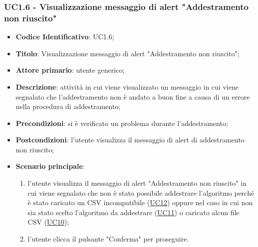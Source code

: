 	\subsubsection{UC1.6 - Visualizzazione messaggio di alert "Addestramento non riuscito"}
		\begin{itemize}
			\item\textbf{Codice Identificativo}: UC1.6;
			\item\textbf{Titolo}: Visualizzazione messaggio di alert "Addestramento non riuscito";
			\item\textbf{Attore primario}: utente generico;
			\item\textbf{Descrizione}: attività in cui viene visualizzato un messaggio in cui viene segnalato che l'addestramento non è andato a buon fine a causa di un errore nella procedura di addestramento;
			\item\textbf{Precondizioni}: si è verificato un problema durante l'addestramento;
			\item\textbf{Postcondizioni}: l'utente visualizza il messaggio di alert di addestramento non riuscito;					
			\item\textbf{Scenario principale}:
				\begin{enumerate}
				\item l'utente visualizza il messaggio di alert "Addestramento non riuscito" in cui viene segnalato che non è stato possibile addestrare l'algoritmo perché è stato caricato un CSV incompatibile (\hyperref[par:UC12]{UC12}) oppure nel caso in cui non sia stato scelto l'algoritmo da addestrare (\hyperref[par:UC11]{UC11}) o caricato alcun file CSV (\hyperref[par:UC10]{UC10});
				\item l'utente clicca il pulsante "Conferma" per proseguire.
					
				\end{enumerate}
				
					
				
					
		\end{itemize}
		
		\label{par:UC1.7}
